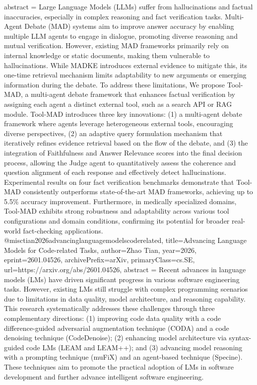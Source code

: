 {      abstract = {Large Language Models (LLMs) suffer from hallucinations and factual inaccuracies, especially in complex reasoning and fact verification tasks. Multi-Agent Debate (MAD) systems aim to improve answer accuracy by enabling multiple LLM agents to engage in dialogue, promoting diverse reasoning and mutual verification. However, existing MAD frameworks primarily rely on internal knowledge or static documents, making them vulnerable to hallucinations. While MADKE introduces external evidence to mitigate this, its one-time retrieval mechanism limits adaptability to new arguments or emerging information during the debate. To address these limitations, We propose Tool-MAD, a multi-agent debate framework that enhances factual verification by assigning each agent a distinct external tool, such as a search API or RAG module. Tool-MAD introduces three key innovations: (1) a multi-agent debate framework where agents leverage heterogeneous external tools, encouraging diverse perspectives, (2) an adaptive query formulation mechanism that iteratively refines evidence retrieval based on the flow of the debate, and (3) the integration of Faithfulness and Answer Relevance scores into the final decision process, allowing the Judge agent to quantitatively assess the coherence and question alignment of each response and effectively detect hallucinations. Experimental results on four fact verification benchmarks demonstrate that Tool-MAD consistently outperforms state-of-the-art MAD frameworks, achieving up to 5.5\% accuracy improvement. Furthermore, in medically specialized domains, Tool-MAD exhibits strong robustness and adaptability across various tool configurations and domain conditions, confirming its potential for broader real-world fact-checking applications.}
}@misc{tian2026advancinglanguagemodelscoderelated,
      title={Advancing Language Models for Code-related Tasks}, 
      author={Zhao Tian},
      year={2026},
      eprint={2601.04526},
      archivePrefix={arXiv},
      primaryClass={cs.SE},
      url={https://arxiv.org/abs/2601.04526},
      abstract = {Recent advances in language models (LMs) have driven significant progress in various software engineering tasks. However, existing LMs still struggle with complex programming scenarios due to limitations in data quality, model architecture, and reasoning capability. This research systematically addresses these challenges through three complementary directions: (1) improving code data quality with a code difference-guided adversarial augmentation technique (CODA) and a code denoising technique (CodeDenoise); (2) enhancing model architecture via syntax-guided code LMs (LEAM and LEAM++); and (3) advancing model reasoning with a prompting technique (muFiX) and an agent-based technique (Specine). These techniques aim to promote the practical adoption of LMs in software development and further advance intelligent software engineering.}
}
